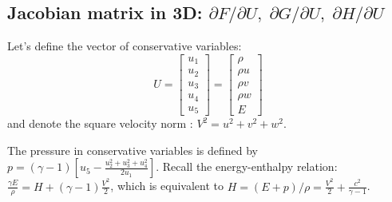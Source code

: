 \documentclass{article}
\begin{document}
\newpage
\subsection{Jacobian matrix in 3D: \boldmath $\partial F/\partial U, \; \partial G/\partial U, \; \partial H/\partial U$}

Let's define the vector of conservative variables:
\begin{equation}
  U = \left[
    \begin{array}{c}
      u_1\\
      u_2\\
      u_3\\
      u_4\\
      u_5
    \end{array}
  \right] = \left[
    \begin{array}{c}
      \rho\\
      \rho u\\
      \rho v\\
      \rho w\\
      E
    \end{array}
  \right]
\end{equation}
and denote the square velocity norm : $V^2=u^2+v^2+w^2$.

The pressure in conservative variables is defined by $p=(\gamma-1)[u_5-\frac{u_2^2+u_3^2+u_4^2}{2u_1} ]$.
Recall the energy-enthalpy relation: $\frac{\gamma E}{\rho} = H+(\gamma-1)\frac{V^2}{2}$, which is equivalent to $H = (E+p)/\rho = \frac{V^2}{2}+\frac{c^2}{\gamma-1}$.
\end{document}
